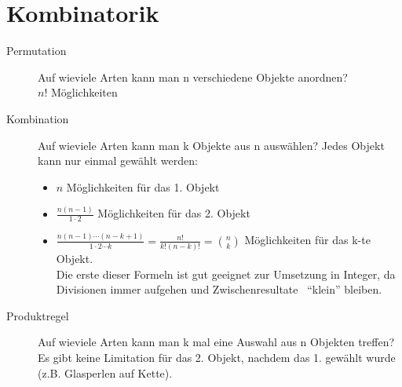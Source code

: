 \documentclass[10pt,a4paper]{scrartcl}
\begin{document}
\section{Kombinatorik}
\begin{description}
\item[Permutation] Auf wieviele Arten kann man n verschiedene Objekte anordnen? \\
    $n!$ Möglichkeiten
\item[Kombination] Auf wieviele Arten kann man k Objekte aus n auswählen? Jedes Objekt kann nur einmal gewählt werden: 
    \begin{itemize}
    \item $n$ Möglichkeiten für das 1. Objekt
    \item $\frac{n(n-1)}{1\cdot2}$ Möglichkeiten für das 2. Objekt
    \item $\frac{n(n-1)\cdots(n-k+1)}{1 \cdot 2 \cdots k} = \frac{n!}{k!(n-k)!} = {n \choose k}$ Möglichkeiten für das k-te Objekt. \\
    Die erste dieser Formeln ist gut geeignet zur Umsetzung in Integer, da Divisionen immer aufgehen und Zwischenresultate  ``klein'' bleiben.
    \end{itemize}
\item[Produktregel] Auf wieviele Arten kann man k mal eine Auswahl aus n Objekten treffen? Es gibt keine Limitation für das 2. Objekt, nachdem das 1. gewählt wurde (z.B. Glasperlen auf Kette).
\end{description}
\end{document}
